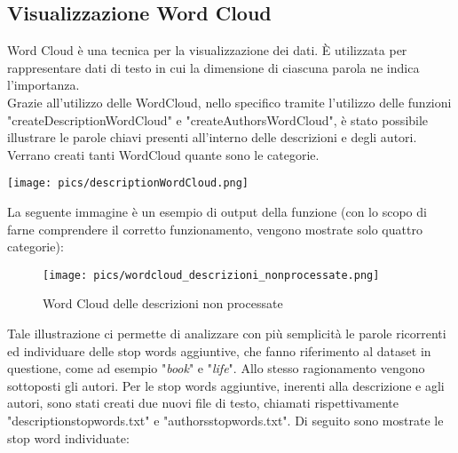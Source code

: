 \documentclass[12pt,oneside]{article}
\begin{document}
    \hfill
    \begin{enumerate}
    \subsection{Visualizzazione Word Cloud}\label{word}
    \begin{justify}
    Word Cloud è una tecnica per la visualizzazione dei dati. È utilizzata per rappresentare dati di testo in cui la dimensione di ciascuna parola ne indica l'importanza.\\
    Grazie all'utilizzo delle WordCloud, nello specifico tramite l'utilizzo delle funzioni "createDescriptionWordCloud" e "createAuthorsWordCloud", è stato possibile illustrare le parole chiavi presenti all'interno delle descrizioni e degli autori. Verrano creati tanti WordCloud quante sono le categorie.
    \end{justify}
    \texttt{[image: pics/descriptionWordCloud.png]}

    \begin{justify}
    La seguente immagine è un esempio di output della funzione (con lo scopo di farne comprendere il corretto funzionamento, vengono mostrate solo quattro categorie):
    \end{justify}
    \begin{figure}[H]
    \centering
    \texttt{[image: pics/wordcloud\_descrizioni\_nonprocessate.png]}
    \caption{Word Cloud delle descrizioni non processate}
    \end{figure}


    \begin{justify}
    Tale illustrazione ci permette di analizzare con più semplicità le parole ricorrenti ed individuare delle stop words aggiuntive, che fanno riferimento al dataset in questione, come ad esempio "\textit{book}" e "\textit{life}". Allo stesso ragionamento vengono sottoposti gli autori. Per le stop words aggiuntive, inerenti alla descrizione e agli autori, sono stati creati due nuovi file di testo, chiamati rispettivamente "description\textunderscore{}stopwords.txt" e "authors\textunderscore{}stopwords.txt". Di seguito sono mostrate le stop word individuate:
    \end{justify}
    

\end{enumerate}
\end{document}
